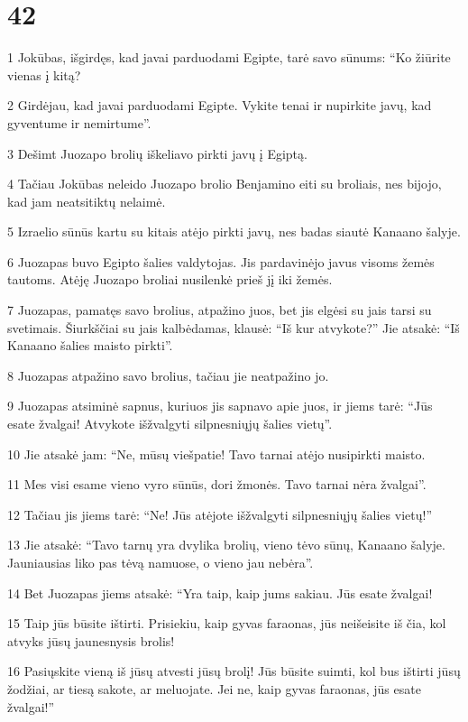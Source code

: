 \chapter{42}


\par 1 Jokūbas, išgirdęs, kad javai parduodami Egipte, tarė savo sūnums: “Ko žiūrite vienas į kitą? 
\par 2 Girdėjau, kad javai parduodami Egipte. Vykite tenai ir nupirkite javų, kad gyventume ir nemirtume”. 
\par 3 Dešimt Juozapo brolių iškeliavo pirkti javų į Egiptą. 
\par 4 Tačiau Jokūbas neleido Juozapo brolio Benjamino eiti su broliais, nes bijojo, kad jam neatsitiktų nelaimė. 
\par 5 Izraelio sūnūs kartu su kitais atėjo pirkti javų, nes badas siautė Kanaano šalyje. 
\par 6 Juozapas buvo Egipto šalies valdytojas. Jis pardavinėjo javus visoms žemės tautoms. Atėję Juozapo broliai nusilenkė prieš jį iki žemės. 
\par 7 Juozapas, pamatęs savo brolius, atpažino juos, bet jis elgėsi su jais tarsi su svetimais. Šiurkščiai su jais kalbėdamas, klausė: “Iš kur atvykote?” Jie atsakė: “Iš Kanaano šalies maisto pirkti”. 
\par 8 Juozapas atpažino savo brolius, tačiau jie neatpažino jo. 
\par 9 Juozapas atsiminė sapnus, kuriuos jis sapnavo apie juos, ir jiems tarė: “Jūs esate žvalgai! Atvykote išžvalgyti silpnesniųjų šalies vietų”. 
\par 10 Jie atsakė jam: “Ne, mūsų viešpatie! Tavo tarnai atėjo nusipirkti maisto. 
\par 11 Mes visi esame vieno vyro sūnūs, dori žmonės. Tavo tarnai nėra žvalgai”. 
\par 12 Tačiau jis jiems tarė: “Ne! Jūs atėjote išžvalgyti silpnesniųjų šalies vietų!” 
\par 13 Jie atsakė: “Tavo tarnų yra dvylika brolių, vieno tėvo sūnų, Kanaano šalyje. Jauniausias liko pas tėvą namuose, o vieno jau nebėra”. 
\par 14 Bet Juozapas jiems atsakė: “Yra taip, kaip jums sakiau. Jūs esate žvalgai! 
\par 15 Taip jūs būsite ištirti. Prisiekiu, kaip gyvas faraonas, jūs neišeisite iš čia, kol atvyks jūsų jaunesnysis brolis! 
\par 16 Pasiųskite vieną iš jūsų atvesti jūsų brolį! Jūs būsite suimti, kol bus ištirti jūsų žodžiai, ar tiesą sakote, ar meluojate. Jei ne, kaip gyvas faraonas, jūs esate žvalgai!” 
